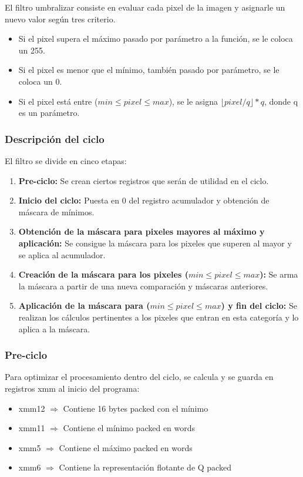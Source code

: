 El filtro umbralizar consiste en evaluar cada pixel de la imagen y asignarle un nuevo valor según tres criterio.
\begin{itemize}
\item Si el pixel supera el máximo pasado por parámetro a la función, se le coloca un 255.
\item Si el pixel es menor que el mínimo, también pasado por parámetro, se le coloca un 0.
\item Si el pixel está entre ($min \leq pixel \leq max$), se le asigna $\lfloor pixel/q \rfloor * q$, donde q es un parámetro.
\end{itemize}

\subsubsection{Descripción del ciclo}
El filtro se divide en cinco etapas:
\begin{enumerate}
\item \textbf{Pre-ciclo:} Se crean ciertos registros que serán de utilidad en el ciclo.
\item \textbf{Inicio del ciclo:} Puesta en 0 del registro acumulador y obtención de máscara de mínimos.
\item \textbf{Obtención de la máscara para pixeles mayores al máximo y aplicación:} Se consigue la máscara para los pixeles que superen al mayor y se aplica al acumulador.
\item \textbf{Creación de la máscara para los pixeles ($min \leq pixel \leq max$):} Se arma la máscara a partir de una nueva comparación y máscaras anteriores.
\item \textbf{Aplicación de la máscara para ($min \leq pixel \leq max$) y fin del ciclo:} Se realizan los cálculos pertinentes a los pixeles que entran en esta categoría y lo aplica a la máscara.
\end{enumerate}

\subsubsection{Pre-ciclo}
Para optimizar el procesamiento dentro del ciclo, se calcula y se guarda en registros xmm al inicio del programa:
\begin{itemize}
  \item xmm12 $\Rightarrow$ Contiene 16 bytes packed con el mínimo
  \item xmm11 $\Rightarrow$ Contiene el mínimo packed en words
  \item xmm5 $\Rightarrow$ Contiene el máximo packed en words
  \item xmm6 $\Rightarrow$ Contiene la representación flotante de Q packed
\end{itemize}


